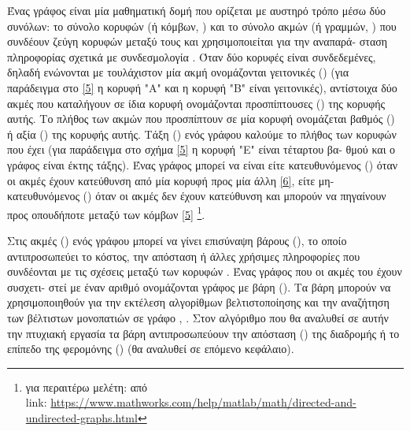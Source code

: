 Ένας γράφος είναι μία μαθηματική δομή που ορίζεται με αυστηρό τρόπο μέσω δύο συνόλων: το σύνολο κορυφών (ή κόμβων, ) και το σύνολο ακμών (ή γραμμών, ) που συνδέουν ζεύγη κορυφών μεταξύ τους και χρησιμοποιείται για την αναπαρά- σταση πληροφορίας σχετικά με συνδεσμολογία \cite{ntenisiwtis2023thewria}. Όταν δύο κορυφές είναι συνδεδεμένες, δηλαδή ενώνονται με τουλάχιστον μία ακμή ονομάζονται γειτονικές () (για παράδειγμα στο \ref{5} η κορυφή "Α" και η κορυφή "Β" είναι γειτονικές), αντίστοιχα δύο ακμές που καταλήγουν σε ίδια κορυφή ονομάζονται προσπίπτουσες () της κορυφής αυτής. Το πλήθος των ακμών που προσπίπτουν σε μία κορυφή ονομάζεται βαθμός () ή αξία () της κορυφής αυτής. Τάξη () ενός γράφου καλούμε το πλήθος των κορυφών που έχει (για παράδειγμα στο σχήμα \ref{5} η κορυφή "Ε" είναι τέταρτου βα- θμού και ο γράφος είναι έκτης τάξης). Ένας γράφος μπορεί να είναι είτε κατευθυνόμενος () όταν οι ακμές έχουν κατεύθυνση από μία κορυφή προς μία άλλη \ref{6}, είτε μη-κατευθυνόμενος () όταν οι ακμές δεν έχουν κατεύθυνση και μπορούν να πηγαίνουν προς οπουδήποτε μεταξύ των κόμβων \ref{5} \cite{gkertsis2023thewria} \footnote{για περαιτέρω μελέτη:  από \\ link: \url{https://www.mathworks.com/help/matlab/math/directed-and-undirected-graphs.html}}.

Στις ακμές () ενός γράφου μπορεί να γίνει επισύναψη βάρους (), το οποίο αντιπροσωπεύει το κόστος, την απόσταση ή άλλες χρήσιμες πληροφορίες που συνδέονται με τις σχέσεις μεταξύ των κορυφών . Ένας γράφος που οι ακμές του έχουν συσχετι- στεί με έναν αριθμό ονομάζονται γράφος με βάρη (). Τα βάρη μπορούν να χρησιμοποιηθούν για την εκτέλεση αλγορίθμων βελτιστοποίησης και την αναζήτηση των βέλτιστων μονοπατιών σε γράφο \cite{ntenisiwtis2023thewria}, \cite{gkertsis2023thewria}. Στον αλγόριθμο που θα αναλυθεί σε αυτήν την πτυχιακή εργασία τα βάρη αντιπροσωπεύουν την απόσταση () της διαδρομής ή το επίπεδο της φερομόνης () (θα αναλυθεί σε επόμενο κεφάλαιο).



